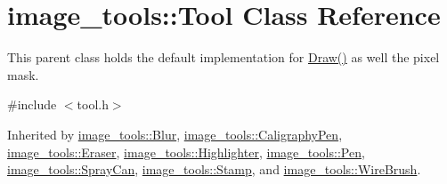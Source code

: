 \hypertarget{classimage__tools_1_1Tool}{}\section{image\+\_\+tools\+:\+:Tool Class Reference}
\label{classimage__tools_1_1Tool}


This parent class holds the default implementation for \hyperlink{classimage__tools_1_1Tool_aa5a313769f2a2c5c83b816da81e82bd2}{Draw()} as well the pixel mask.  




{\ttfamily \#include $<$tool.\+h$>$}



Inherited by \hyperlink{classimage__tools_1_1Blur}{image\+\_\+tools\+::\+Blur}, \hyperlink{classimage__tools_1_1CaligraphyPen}{image\+\_\+tools\+::\+Caligraphy\+Pen}, \hyperlink{classimage__tools_1_1Eraser}{image\+\_\+tools\+::\+Eraser}, \hyperlink{classimage__tools_1_1Highlighter}{image\+\_\+tools\+::\+Highlighter}, \hyperlink{classimage__tools_1_1Pen}{image\+\_\+tools\+::\+Pen}, \hyperlink{classimage__tools_1_1SprayCan}{image\+\_\+tools\+::\+Spray\+Can}, \hyperlink{classimage__tools_1_1Stamp}{image\+\_\+tools\+::\+Stamp}, and \hyperlink{classimage__tools_1_1WireBrush}{image\+\_\+tools\+::\+Wire\+Brush}.

